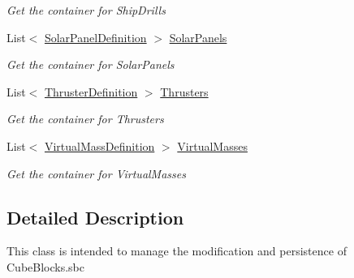 \begin{DoxyCompactItemize}
\begin{DoxyCompactList}\small\item\em Get the container for Ship\+Drills \end{DoxyCompactList}\item 
List$<$ \hyperlink{class_s_e_mod_a_p_i_1_1_a_p_i_1_1_definitions_1_1_cube_blocks_1_1_solar_panel_definition}{Solar\+Panel\+Definition} $>$ \hyperlink{class_s_e_mod_a_p_i_1_1_a_p_i_1_1_definitions_1_1_cube_blocks_1_1_blocks_manager_a7a4faf2561e80b6397553e0afa34ddc0}{Solar\+Panels}
\begin{DoxyCompactList}\small\item\em Get the container for Solar\+Panels \end{DoxyCompactList}\item 
List$<$ \hyperlink{class_s_e_mod_a_p_i_1_1_a_p_i_1_1_definitions_1_1_cube_blocks_1_1_thruster_definition}{Thruster\+Definition} $>$ \hyperlink{class_s_e_mod_a_p_i_1_1_a_p_i_1_1_definitions_1_1_cube_blocks_1_1_blocks_manager_aa51992a83d36cdc904d7c07e329e8987}{Thrusters}
\begin{DoxyCompactList}\small\item\em Get the container for Thrusters \end{DoxyCompactList}\item 
List$<$ \hyperlink{class_s_e_mod_a_p_i_1_1_a_p_i_1_1_definitions_1_1_cube_blocks_1_1_virtual_mass_definition}{Virtual\+Mass\+Definition} $>$ \hyperlink{class_s_e_mod_a_p_i_1_1_a_p_i_1_1_definitions_1_1_cube_blocks_1_1_blocks_manager_a2a38a0066ec2370e7ea91888f0ca9b34}{Virtual\+Masses}
\begin{DoxyCompactList}\small\item\em Get the container for Virtual\+Masses \end{DoxyCompactList}\end{DoxyCompactItemize}


\subsection{Detailed Description}
This class is intended to manage the modification and persistence of Cube\+Blocks.\+sbc 



